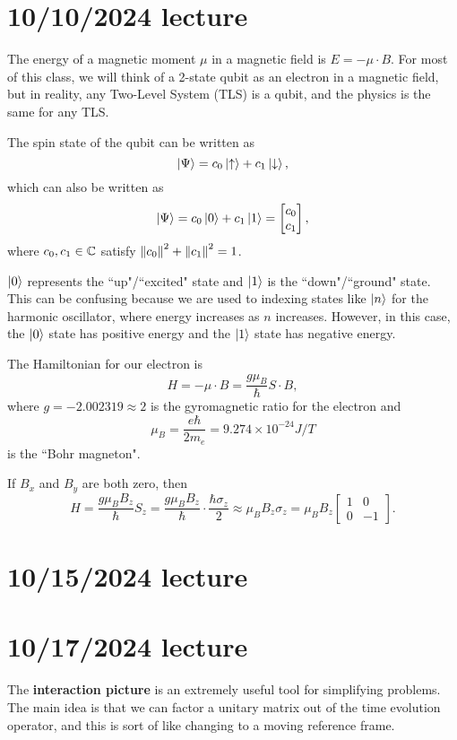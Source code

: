 \documentclass{article}
\begin{document}
\section{10/10/2024 lecture}
The energy of a magnetic moment $\mu$ in a magnetic field is $E = - \mu \cdot B$. For most of this class, we will think of a 2-state qubit as an electron in a magnetic field, but in reality, any Two-Level System (TLS) is a qubit, and the physics is the same for any TLS.
\par
The spin state of the qubit can be written as
\[ \left\lvert \Psi \right\rangle = c_0 \left\lvert \uparrow \right\rangle + c_1 \left\lvert \downarrow \right\rangle, \]
which can also be written as
\[ \left\lvert \Psi \right\rangle = c_0 \left\lvert 0 \right\rangle + c_1 \left\lvert 1 \right\rangle = \begin{bmatrix}
    c_0 \\
    c_1
\end{bmatrix}, \]
where $c_0, c_1 \in \mathbb{C}$ satisfy $\left\lVert c_0\right\rVert^2+\left\lVert c_1\right\rVert^2 = 1$.
\begin{note}
    $\left\lvert 0 \right\rangle$ represents the ``up"/``excited" state and $\left\lvert 1 \right\rangle$ is the ``down"/``ground" state. This can be confusing because we are used to indexing states like $\left\lvert n \right\rangle$ for the harmonic oscillator, where energy increases as $n$ increases. However, in this case, the $\left\lvert 0 \right\rangle$ state has positive energy and the $\left\lvert 1 \right\rangle$ state has negative energy.
\end{note}
The Hamiltonian for our electron is
\[ H = -\mu \cdot B = \frac{g \mu_B}{\hbar} S \cdot B, \]
where $g = -2.002319 \approx 2$ is the gyromagnetic ratio for the electron and
\[ \mu_B = \frac{e \hbar}{2 m_e} = 9.274 \times 10^{-24} J/T \]
is the ``Bohr magneton".
\par
If $B_x$ and $B_y$ are both zero, then
\[ H = \frac{g \mu_B B_z}{\hbar} S_z = \frac{g \mu_B B_z}{\hbar} \cdot \frac{\hbar \sigma_z}{2} \approx \mu_B B_z \sigma_z = \mu_B B_z \begin{bmatrix}
    1 & 0 \\
    0 & -1
\end{bmatrix}. \]


\section{10/15/2024 lecture}

\section{10/17/2024 lecture}
The \textbf{interaction picture} is an extremely useful tool for simplifying problems. The main idea is that we can factor a unitary matrix out of the time evolution operator, and this is sort of like changing to a moving reference frame.
\end{document}
